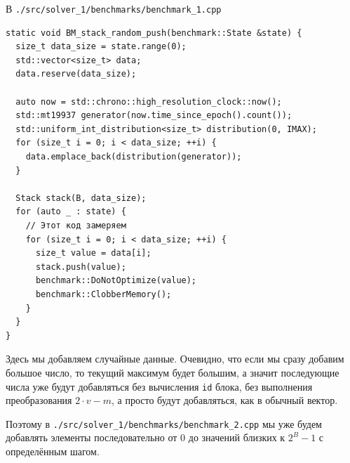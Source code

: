 В \texttt{./src/solver_1/benchmarks/benchmark_1.cpp}
\begin{verbatim}
static void BM_stack_random_push(benchmark::State &state) {
  size_t data_size = state.range(0);
  std::vector<size_t> data;
  data.reserve(data_size);

  auto now = std::chrono::high_resolution_clock::now();
  std::mt19937 generator(now.time_since_epoch().count());
  std::uniform_int_distribution<size_t> distribution(0, IMAX);
  for (size_t i = 0; i < data_size; ++i) {
    data.emplace_back(distribution(generator));
  }

  Stack stack(B, data_size);
  for (auto _ : state) {
    // Этот код замеряем
    for (size_t i = 0; i < data_size; ++i) {
      size_t value = data[i];
      stack.push(value);
      benchmark::DoNotOptimize(value);
      benchmark::ClobberMemory();
    }
  }
}
\end{verbatim}

Здесь мы добавляем случайные данные. Очевидно, что если мы сразу добавим большое число, то текущий максимум будет большим, а значит последующие числа уже будут добавляться без вычисления \texttt{id} блока, без выполнения преобразования \(2\cdot v - m\), а просто будут добавляться, как в обычный вектор.

Поэтому в \texttt{./src/solver_1/benchmarks/benchmark_2.cpp} мы уже будем добавлять элементы последовательно от \(0\) до значений близких к \(2^B- 1\) с определённым шагом. 

